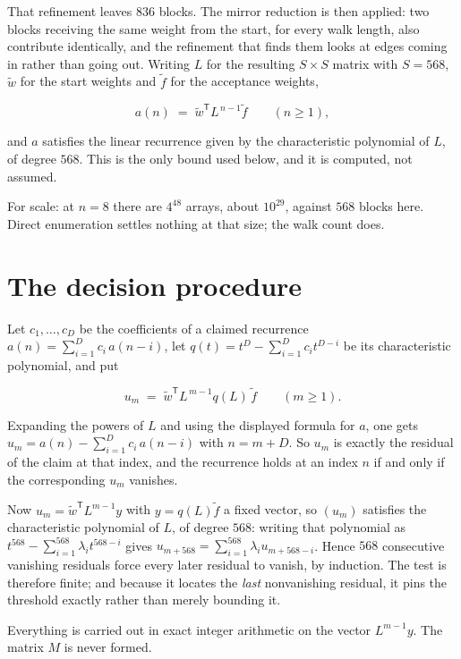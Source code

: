 \documentclass[11pt]{article}
\theoremstyle{definition}
\begin{document}
That refinement leaves $836$ blocks. The mirror reduction is then applied: two blocks receiving the same weight from the start, for every walk length, also contribute identically, and the refinement that finds them looks at edges coming in rather than going out. Writing $L$ for the resulting $S \times S$ matrix with $S = 568$, $\tilde w$ for the start weights and $\tilde f$ for the acceptance weights,

\[a(n) \;=\; \tilde w^{\mathsf T} L^{\,n-1} \tilde f \qquad (n \ge 1),\]

and $a$ satisfies the linear recurrence given by the characteristic polynomial of $L$, of degree $568$. This is the only bound used below, and it is computed, not assumed.

For scale: at $n = 8$ there are $4^{48}$ arrays, about $10^{29}$, against $568$ blocks here. Direct enumeration settles nothing at that size; the walk count does.

\section{The decision procedure}

Let $c_1,\dots,c_D$ be the coefficients of a claimed recurrence $a(n) = \sum_{i=1}^{D} c_i\,a(n-i)$, let $q(t) = t^{D} - \sum_{i=1}^{D} c_i t^{D-i}$ be its characteristic polynomial, and put

\[u_m \;=\; \tilde w^{\mathsf T} L^{\,m-1} q(L)\,\tilde f \qquad (m \ge 1).\]

Expanding the powers of $L$ and using the displayed formula for $a$, one gets $u_m = a(n) - \sum_{i=1}^{D} c_i\,a(n-i)$ with $n = m + D$. So $u_m$ is exactly the residual of the claim at that index, and the recurrence holds at an index $n$ if and only if the corresponding $u_m$ vanishes.

Now $u_m = \tilde w^{\mathsf T} L^{m-1} y$ with $y = q(L)\tilde f$ a fixed vector, so $(u_m)$ satisfies the characteristic polynomial of $L$, of degree $568$: writing that polynomial as $t^{568} - \sum_{i=1}^{568} \lambda_i t^{568-i}$ gives $u_{m+568} = \sum_{i=1}^{568} \lambda_i u_{m+568-i}$. Hence $568$ consecutive vanishing residuals force every later residual to vanish, by induction. The test is therefore finite; and because it locates the {\itshape last} nonvanishing residual, it pins the threshold exactly rather than merely bounding it.

Everything is carried out in exact integer arithmetic on the vector $L^{m-1}y$. The matrix $M$ is never formed.
\end{document}
